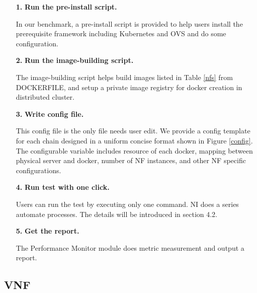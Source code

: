 \begin{itemize}
\item[\textbf{1.}]{}\textbf{Run the pre-install script.}

In our benchmark, a pre-install script is provided to 
help users install the prerequisite framework including Kubernetes and OVS
and do some configuration. 

\item[\textbf{2.}]{}\textbf{Run the image-building script.}

The image-building script helps build images listed in Table \ref{nfs} from DOCKERFILE, and setup a private image registry 
for docker creation in distributed cluster.

\item[\textbf{3.}]{}\textbf{Write config file.}

This config file is the only file needs user edit.
We provide a config template for each chain 
designed in a uniform concise format shown in Figure \ref{config}. 
The configurable variable includes resource of each docker,
mapping between physical server and docker,
number of NF instances, and other NF specific configurations.

\item[\textbf{4.}]{}\textbf{Run test with one click.}

Users can run the test by executing only one command.
NI does a series automate processes. 
The details will be introduced in section 4.2.

\item[\textbf{5.}]{}\textbf{Get the report.}

The Performance Monitor module does metric measurement
and output a report.

\end{itemize}


\subsection{VNF}


